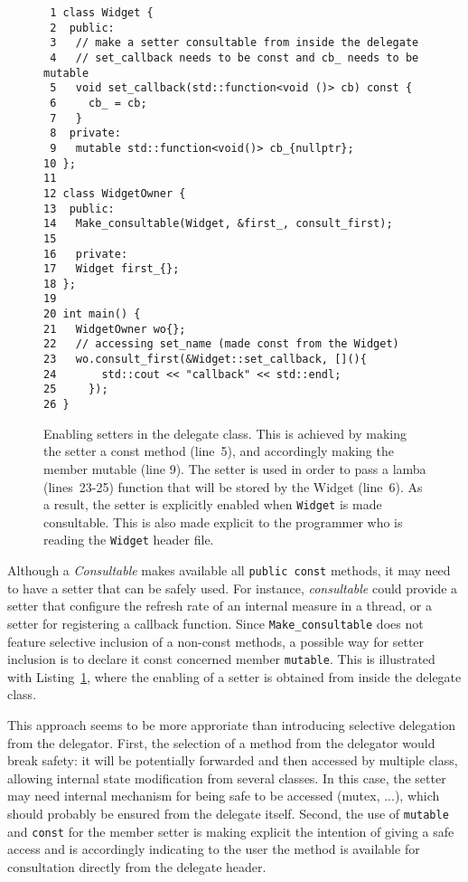\documentclass{article}
\begin{document}
\begin{figure}[ht]
{\small
\begin{lstlisting}
 1 class Widget {
 2  public:
 3   // make a setter consultable from inside the delegate 
 4   // set_callback needs to be const and cb_ needs to be mutable
 5   void set_callback(std::function<void ()> cb) const {
 6     cb_ = cb;
 7   }
 8  private:
 9   mutable std::function<void()> cb_{nullptr};
10 };
11 
12 class WidgetOwner {
13  public:
14   Make_consultable(Widget, &first_, consult_first);
15   
16   private:
17   Widget first_{};
18 };
19 
20 int main() {
21   WidgetOwner wo{};
22   // accessing set_name (made const from the Widget)
23   wo.consult_first(&Widget::set_callback, [](){
24       std::cout << "callback" << std::endl;
25     });
26 }
\end{lstlisting}}
\cprotect\caption{Enabling setters in the delegate class. This is achieved by making the setter a const method (line~5), and accordingly making the member mutable (line 9). The setter is used in order to pass a lamba (lines~23-25) function that will be stored by the Widget (line~6). As a result, the setter is explicitly enabled when \verb+Widget+ is made consultable. This is also made explicit to the programmer who is reading the \verb+Widget+ header file.}
\label{example:setters}
\end{figure}

Although a \textit{Consultable} makes available all \verb+public const+ methods, it may need to have a setter that can be safely used. For instance, \textit{consultable} could provide a setter that configure the refresh rate of an internal measure in a thread, or a setter for registering a callback function. Since \verb+Make_consultable+ does not feature selective inclusion of a non-const methods, a possible way for setter inclusion is to declare it const concerned member \verb+mutable+. This is illustrated with Listing~\ref{example:setters}, where the enabling of a setter is obtained from inside the delegate class. 

This approach seems to be more approriate than introducing selective delegation from the delegator. First, the selection of a method from the delegator would break safety: it will be potentially forwarded and then accessed by multiple class, allowing internal state modification from several classes. In this case, the setter may need internal mechanism for being safe to be accessed (mutex, ...), which should probably be ensured from the delegate itself. Second, the use of \verb+mutable+ and \verb+const+ for the member setter is making explicit the intention of giving a safe access and is accordingly indicating to the user the method is available for consultation directly from the delegate header. 
\end{document}
